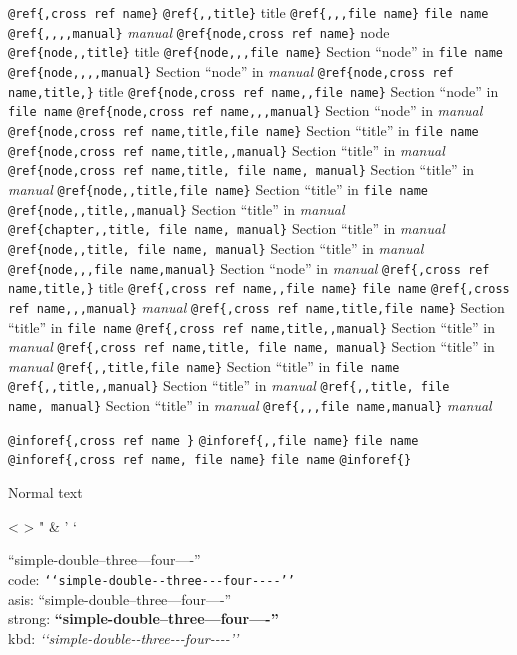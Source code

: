 \documentclass{book}
\newcommand\Texinfocommandstyletextkbd[1]{{\ttfamily\textsl{#1}}}%
\renewcommand{\_}{\Texinfounderscore\discretionary{}{}{}}
\begin{document}
{\texttt{@ref\{,cross ref name\}} 
\texttt{@ref\{{,}{,}title\}} title
\texttt{@ref\{{,}{,},file name\}} \texttt{file name}
\texttt{@ref\{{,}{,}{,}{,}manual\}} \textsl{manual}
\texttt{@ref\{node,cross ref name\}} node
\texttt{@ref\{node{,}{,}title\}} title
\texttt{@ref\{node{,}{,},file name\}} Section ``node'' in \texttt{file name}
\texttt{@ref\{node{,}{,}{,}{,}manual\}} Section ``node'' in \textsl{manual}
\texttt{@ref\{node,cross ref name,title,\}} title
\texttt{@ref\{node,cross ref name{,}{,}file name\}} Section ``node'' in \texttt{file name}
\texttt{@ref\{node,cross ref name{,}{,},manual\}} Section ``node'' in \textsl{manual}
\texttt{@ref\{node,cross ref name,title,file name\}} Section ``title'' in \texttt{file name}
\texttt{@ref\{node,cross ref name,title{,}{,}manual\}} Section ``title'' in \textsl{manual}
\texttt{@ref\{node,cross ref name,title,\ file name,\ manual\}} Section ``title'' in \textsl{manual}
\texttt{@ref\{node{,}{,}title,file name\}} Section ``title'' in \texttt{file name}
\texttt{@ref\{node{,}{,}title{,}{,}manual\}} Section ``title'' in \textsl{manual}
\texttt{@ref\{chapter{,}{,}title,\ file name,\ manual\}} Section ``title'' in \textsl{manual}
\texttt{@ref\{node{,}{,}title,\ file name,\ manual\}} Section ``title'' in \textsl{manual}
\texttt{@ref\{node{,}{,},file name,manual\}} Section ``node'' in \textsl{manual}
\texttt{@ref\{,cross ref name,title,\}} title
\texttt{@ref\{,cross ref name{,}{,}file name\}} \texttt{file name}
\texttt{@ref\{,cross ref name{,}{,},manual\}} \textsl{manual}
\texttt{@ref\{,cross ref name,title,file name\}} Section ``title'' in \texttt{file name}
\texttt{@ref\{,cross ref name,title{,}{,}manual\}} Section ``title'' in \textsl{manual}
\texttt{@ref\{,cross ref name,title,\ file name,\ manual\}} Section ``title'' in \textsl{manual}
\texttt{@ref\{{,}{,}title,file name\}} Section ``title'' in \texttt{file name}
\texttt{@ref\{{,}{,}title{,}{,}manual\}} Section ``title'' in \textsl{manual}
\texttt{@ref\{{,}{,}title,\ file name,\ manual\}} Section ``title'' in \textsl{manual}
\texttt{@ref\{{,}{,},file name,manual\}} \textsl{manual}

\texttt{@inforef\{,cross ref name \}} 
\texttt{@inforef\{{,}{,}file name\}} \texttt{file name}
\texttt{@inforef\{,cross ref name,\ file name\}} \texttt{file name}
\texttt{@inforef\{\}} 



Normal text

<
>
"
\&
'
`

``simple-double--three---four----''\leavevmode{}\\
code: \texttt{{`}{`}simple-double{-}{-}three{-}{-}{-}four{-}{-}{-}-{'}{'}} \leavevmode{}\\
asis: ``simple-double--three---four----'' \leavevmode{}\\
strong: \textbf{``simple-double--three---four----''} \leavevmode{}\\
kbd: \Texinfocommandstyletextkbd{{`}{`}simple-double{-}{-}three{-}{-}{-}four{-}{-}{-}-{'}{'}} \leavevmode{}\\

}
\end{document}
